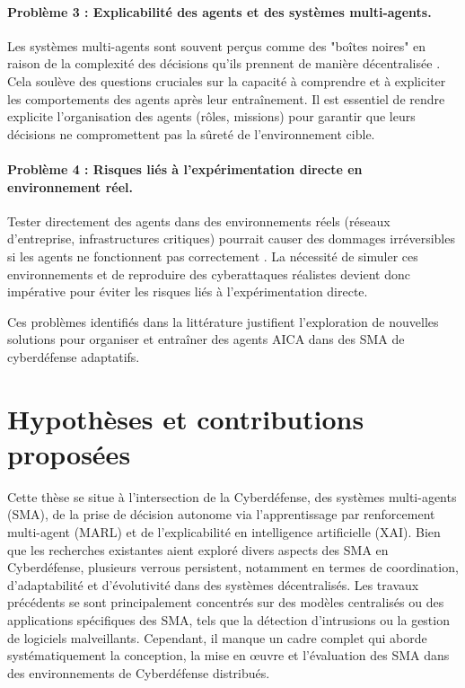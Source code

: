 \paragraph{Problème 3 : Explicabilité des agents et des systèmes multi-agents.}
Les systèmes multi-agents sont souvent perçus comme des "boîtes noires" en raison de la complexité des décisions qu’ils prennent de manière décentralisée \cite{Theron2018}. Cela soulève des questions cruciales sur la capacité à comprendre et à expliciter les comportements des agents après leur entraînement. Il est essentiel de rendre explicite l'organisation des agents (rôles, missions) pour garantir que leurs décisions ne compromettent pas la sûreté de l'environnement cible.

\paragraph{Problème 4 : Risques liés à l'expérimentation directe en environnement réel.}
Tester directement des agents dans des environnements réels (réseaux d'entreprise, infrastructures critiques) pourrait causer des dommages irréversibles si les agents ne fonctionnent pas correctement \cite{Calo2017}. La nécessité de simuler ces environnements et de reproduire des cyberattaques réalistes devient donc impérative pour éviter les risques liés à l’expérimentation directe.

Ces problèmes identifiés dans la littérature justifient l'exploration de nouvelles solutions pour organiser et entraîner des agents AICA dans des SMA de cyberdéfense adaptatifs.


\section{Hypothèses et contributions proposées}

Cette thèse se situe à l'intersection de la Cyberdéfense, des systèmes multi-agents (SMA), de la prise de décision autonome via l'apprentissage par renforcement multi-agent (MARL) et de l'explicabilité en intelligence artificielle (XAI). Bien que les recherches existantes aient exploré divers aspects des SMA en Cyberdéfense, plusieurs verrous persistent, notamment en termes de coordination, d'adaptabilité et d'évolutivité dans des systèmes décentralisés. Les travaux précédents se sont principalement concentrés sur des modèles centralisés ou des applications spécifiques des SMA, tels que la détection d'intrusions ou la gestion de logiciels malveillants. Cependant, il manque un cadre complet qui aborde systématiquement la conception, la mise en œuvre et l'évaluation des SMA dans des environnements de Cyberdéfense distribués.

